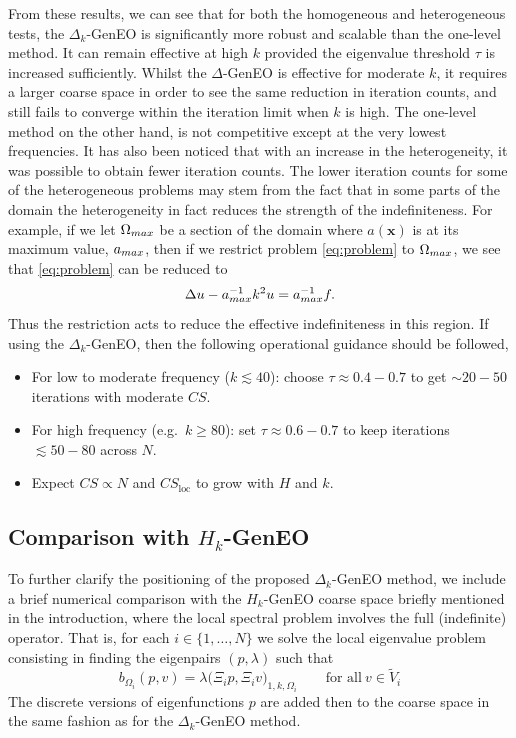 \documentclass[preprint,3p,times]{elsarticle}
\newcommand{\bx}{\bm{x}}
\newcommand{\amax}{a_{\textup{\textsf{max}}}}
\newcommand{\Omegamax}{\Omega_{\textup{\textsf{max}}}}
\theoremstyle{definition}
\numberwithin{equation}{section}
\begin{document}
{From these results, we can see that for both the homogeneous and heterogeneous tests, the $\Delta_k$-GenEO is significantly 
more robust and scalable than the one-level method.  It can remain effective at high $k$ provided the eigenvalue threshold $\tau$ 
is increased sufficiently. Whilst the $\Delta$-GenEO is effective for moderate $k$, it requires a larger coarse space 
in order to see the same reduction in iteration counts, and still fails to converge within the iteration limit when $k$ is high. 
The one-level method on the other hand, is not competitive except at the very lowest frequencies. 
It has also been noticed that with an increase in the heterogeneity, it was possible to obtain fewer iteration counts. 
The lower iteration counts for some of the heterogeneous problems may stem from the fact that in some parts of the 
domain the heterogeneity in fact reduces the strength of the indefiniteness. 
For example, if we let $\Omegamax$ be a section of the domain where $a(\bx)$ is at its maximum value, $\amax$, 
then if we restrict problem \eqref{eq:problem} to $\Omegamax$, we see that \eqref{eq:problem} can be reduced to
\begin{equation*}
    \Delta u - \amax^{-1}k^2u = \amax^{-1} f.
\end{equation*}
Thus the restriction acts to reduce the effective indefiniteness in this region.
If using the $\Delta_k$-GenEO, then the following  operational guidance should be followed,
\begin{itemize}
  \item For low to moderate frequency ($k\lesssim 40$): choose $\tau\approx 0.4\!-\!0.7$ to get $\sim 20\!-\!50$ iterations with moderate $CS$.
  \item For high frequency (e.g.\ $k\ge 80$): set $\tau\approx 0.6\!-\!0.7$ to keep iterations $\lesssim 50\!-\!80$ across $N$.
  \item Expect $CS\propto N$ and $CS_{\text{loc}}$ to grow with $H$ and $k$. 
\end{itemize}
}

\subsection{Comparison with $H_k$-GenEO}

{To further clarify the positioning of the proposed $\Delta_k$-GenEO method, we include a brief numerical comparison with the $H_k$-GenEO coarse space briefly mentioned in the introduction, where the local spectral problem involves the full (indefinite) operator. That is, for each $i\in\{1,\ldots,N\}$ we solve the local eigenvalue problem consisting in finding the eigenpairs $(p,\lambda)$ such that
\[
	b_{\Omega_i}(p,v) = \lambda\bigl(\Xi_i p,\Xi_i v\bigr)_{1,k,\Omega_i}
	\qquad\text{for all} \ v\in\widetilde{V}_i
\]
 The discrete versions of eigenfunctions $p$ are added then to the coarse space in the same fashion as for the $\Delta_k$-GenEO method.}
\end{document}
